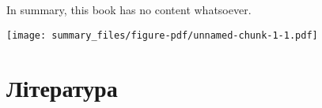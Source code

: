 \documentclass[
  10pt,
  a5paper,
  DIV=11,
  numbers=noendperiod]{scrreprt}
\newenvironment{Shaded}{\begin{snugshade}}{\end{snugshade}}
\newcommand{\FunctionTok}[1]{\textcolor[rgb]{0.28,0.35,0.67}{#1}}
\newcommand{\NormalTok}[1]{\textcolor[rgb]{0.00,0.23,0.31}{#1}}
\newcommand{\SpecialCharTok}[1]{\textcolor[rgb]{0.37,0.37,0.37}{#1}}
\newlength{\cslhangindent}
\newenvironment{CSLReferences}[2] %
 {\begin{list}{}{%
  \setlength{\itemindent}{0pt}
  \setlength{\leftmargin}{0pt}
  \setlength{\parsep}{0pt}
  \ifodd #1
   \setlength{\leftmargin}{\cslhangindent}
   \setlength{\itemindent}{-1\cslhangindent}
  \fi
  \setlength{\itemsep}{#2\baselineskip}}}
 {\end{list}}
\begin{document}
In summary, this book has no content whatsoever.

\begin{Shaded}
\end{Shaded}

\texttt{[image: summary\_files/figure-pdf/unnamed-chunk-1-1.pdf]}


\chapter*{Література}\label{ux43bux456ux442ux435ux440ux430ux442ux443ux440ux430}


\label{refs}
\begin{CSLReferences}{0}{1}
\end{CSLReferences}
\end{document}
